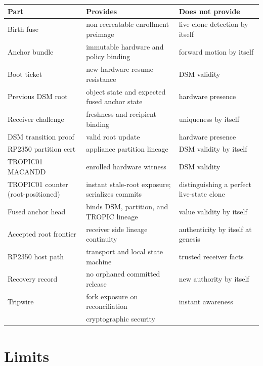 \documentclass[11pt]{article}
\theoremstyle{definition}
\theoremstyle{remark}
\begin{document}
\begin{center}
\begin{tabular}{lll}
\toprule
\textbf{Part} & \textbf{Provides} & \textbf{Does not provide}\\
\midrule
Birth fuse & non recreatable enrollment preimage & live clone detection by itself\\
Anchor bundle & immutable hardware and policy binding & forward motion by itself\\
Boot ticket & new hardware resume resistance & DSM validity\\
Previous DSM root & object state and expected fused anchor state & hardware presence\\
Receiver challenge & freshness and recipient binding & uniqueness by itself\\
DSM transition proof & valid root update & hardware presence\\
RP2350 partition cert & appliance partition lineage & DSM validity by itself\\
TROPIC01 MACANDD & enrolled hardware witness & DSM validity\\
TROPIC01 counter (root-positioned) & instant stale-root exposure; serializes commits & distinguishing a perfect live-state clone\\
Fused anchor head & binds DSM, partition, and TROPIC lineage & value validity by itself\\
Accepted root frontier & receiver side lineage continuity & authenticity by itself at genesis\\
RP2350 host path & transport and local state machine & trusted receiver facts\\
Recovery record & no orphaned committed release & new authority by itself\\
Tripwire & fork exposure on reconciliation & instant awareness\\
 & cryptographic security\\
\bottomrule
\end{tabular}
\end{center}

\section{Limits}
\end{document}
